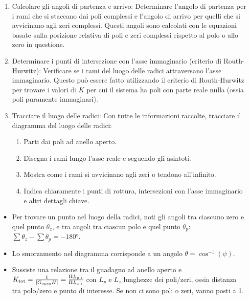 \begin{enumerate}[label=\roman*.]
    \item Calcolare gli angoli di partenza e arrivo: Determinare l'angolo di partenza per i rami che si staccano dai poli complessi e l'angolo di arrivo per quelli che si avvicinano agli zeri complessi. Questi angoli sono calcolati con le equazioni basate sulla posizione relativa di poli e zeri complessi rispetto al polo o allo zero in questione.

    \item Determinare i punti di intersezione con l'asse immaginario (criterio di Routh-Hurwitz): Verificare se i rami del luogo delle radici attraversano l'asse immaginario. Questo può essere fatto utilizzando il criterio di Routh-Hurwitz per trovare i valori di \( K \) per cui il sistema ha poli con parte reale nulla (ossia poli puramente immaginari).

    \item Tracciare il luogo delle radici: Con tutte le informazioni raccolte, tracciare il diagramma del luogo delle radici:
    \begin{enumerate}
        \item Parti dai poli ad anello aperto.
        \item Disegna i rami lungo l'asse reale e seguendo gli asintoti.
        \item Mostra come i rami si avvicinano agli zeri o tendono all'infinito.
        \item Indica chiaramente i punti di rottura, intersezioni con l'asse immaginario e altri dettagli chiave.
    \end{enumerate}
\end{enumerate}

\begin{itemize}
    \item Per trovare un punto nel luogo della radici, noti gli angoli tra ciascuno zero e quel punto \( \theta_z \), e tra angoli tra ciascun polo e quel punto \( \theta_p \): \( \sum \theta_z - \sum \theta_p = -180° \).
    \item Lo smorzamento nel diagramma corrisponde a un angolo \( \theta = \cos^{-1} (\psi) \).
    \item Sussiste una relazione tra il guadagno ad anello aperto e \( K_\text{tot} = \frac{1}{\left|G_\text{open}H\right|} = \frac{\Pi L_{p,i}}{\Pi L_{z,i}} \) con \( L_p \) e \( L_z \) lunghezze dei poli/zeri, ossia distanza tra polo/zero e punto di interesse. Se non ci sono poli o zeri, vanno posti a 1.
\end{itemize}

